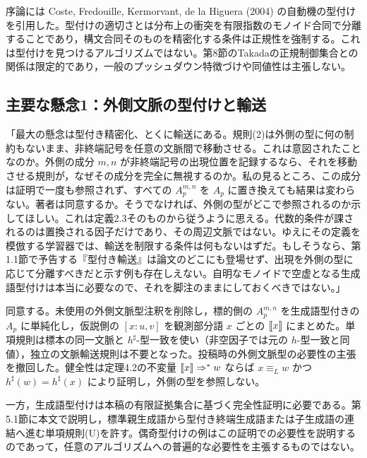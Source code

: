 序論には Coste, Fredouille, Kermorvant, de la Higuera (2004) の自動機の型付けを引用した。型付けの適切さとは分布上の衝突を有限指数のモノイド合同で分離することであり，構文合同そのものを精密化する条件は正規性を強制する。これは型付けを見つけるアルゴリズムではない。第8節のTakadaの正規制御集合との関係は限定的であり，一般のプッシュダウン特徴づけや同値性は主張しない。

\subsection*{主要な懸念1：外側文脈の型付けと輸送}
「最大の懸念は型付き精密化、とくに輸送にある。規則(2)は外側の型に何の制約もないまま、非終端記号を任意の文脈間で移動させる。これは意図されたことなのか。外側の成分 $m,n$ が非終端記号の出現位置を記録するなら、それを移動させる規則が，なぜその成分を完全に無視するのか。私の見るところ、この成分は証明で一度も参照されず、すべての $A^{m,n}_p$ を $A_p$ に置き換えても結果は変わらない。著者は同意するか。そうでなければ、外側の型がどこで参照されるのか示してほしい。これは定義2.3そのものから従うように思える。代数的条件が課されるのは置換される因子だけであり、その周辺文脈ではない。ゆえにその定義を模倣する学習器では、輸送を制限する条件は何もないはずだ。もしそうなら、第1.1節で予告する『型付き輸送』は論文のどこにも登場せず、出現を外側の型に応じて分離すべきだと示す例も存在しえない。自明なモノイドで空虚となる生成語型付けは本当に必要なので、それを脚注のままにしておくべきではない。」

\Reply
同意する。未使用の外側文脈型注釈を削除し，標的側の $A_p^{m,n}$ を生成語型付きの $A_p$ に単純化し，仮説側の $[x:u,v]$ を観測部分語 $x$ ごとの $\llbracket x\rrbracket$ にまとめた。単項規則は標本の同一文脈と $h^\sharp$-型一致を使い（非空因子では元の $h$-型一致と同値），独立の文脈輸送規則は不要となった。投稿時の外側文脈型の必要性の主張を撤回した。健全性は定理4.2の不変量 $\llbracket x\rrbracket\Rightarrow^*w$ ならば $x\equiv_Lw$ かつ $h^\sharp(w)=h^\sharp(x)$ により証明し，外側の型を参照しない。

一方，生成語型付けは本稿の有限証拠集合に基づく完全性証明に必要である。第5.1節に本文で説明し，標準親生成語から型付き終端生成語または子生成語の連結へ進む単項規則(U)を許す。偶奇型付けの例はこの証明での必要性を説明するのであって，任意のアルゴリズムへの普遍的な必要性を主張するものではない。

